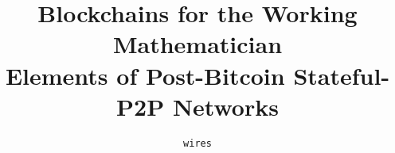 \documentclass[]{article}
\title{
{\Huge Blockchains for the Working Mathematician}\\[.5em]
{\Large Elements of Post-Bitcoin Stateful-P2P Networks}
}
\author{\texttt{wires}}
\begin{document}
\maketitle

\begin{abstract}

\end{abstract}



\end{document}
